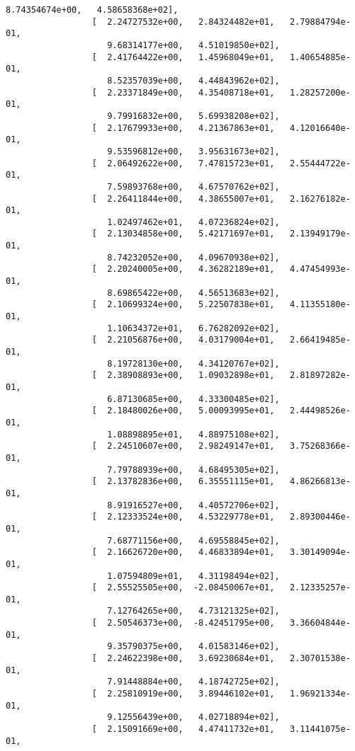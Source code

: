 \documentclass[11pt]{article}
\begin{document}
\begin{Verbatim}[commandchars=\\\{\}]
                    8.74354674e+00,   4.58658368e+02],
                 [  2.24727532e+00,   2.84324482e+01,   2.79884794e-01,
                    9.68314177e+00,   4.51019850e+02],
                 [  2.41764422e+00,   1.45968049e+01,   1.40654885e-01,
                    8.52357039e+00,   4.44843962e+02],
                 [  2.23371849e+00,   4.35408718e+01,   1.28257200e-01,
                    9.79916832e+00,   5.69938208e+02],
                 [  2.17679933e+00,   4.21367863e+01,   4.12016640e-01,
                    9.53596812e+00,   3.95631673e+02],
                 [  2.06492622e+00,   7.47815723e+01,   2.55444722e-01,
                    7.59893768e+00,   4.67570762e+02],
                 [  2.26411844e+00,   4.38655007e+01,   2.16276182e-01,
                    1.02497462e+01,   4.07236824e+02],
                 [  2.13034858e+00,   5.42171697e+01,   2.13949179e-01,
                    8.74232052e+00,   4.09670938e+02],
                 [  2.20240005e+00,   4.36282189e+01,   4.47454993e-01,
                    8.69865422e+00,   4.56513683e+02],
                 [  2.10699324e+00,   5.22507838e+01,   4.11355180e-01,
                    1.10634372e+01,   6.76282092e+02],
                 [  2.21056876e+00,   4.03179004e+01,   2.66419485e-01,
                    8.19728130e+00,   4.34120767e+02],
                 [  2.38908893e+00,   1.09032898e+01,   2.81897282e-01,
                    6.87130685e+00,   4.33300485e+02],
                 [  2.18480026e+00,   5.00093995e+01,   2.44498526e-01,
                    1.08898895e+01,   4.88975108e+02],
                 [  2.24510607e+00,   2.98249147e+01,   3.75268366e-01,
                    7.79788939e+00,   4.68495305e+02],
                 [  2.13782836e+00,   6.35551115e+01,   4.86266813e-01,
                    8.91916527e+00,   4.40572706e+02],
                 [  2.12333524e+00,   4.53229778e+01,   2.89300446e-01,
                    7.68771156e+00,   4.69558845e+02],
                 [  2.16626720e+00,   4.46833894e+01,   3.30149094e-01,
                    1.07594809e+01,   4.31198494e+02],
                 [  2.55525505e+00,  -2.08450067e+01,   2.12335257e-01,
                    7.12764265e+00,   4.73121325e+02],
                 [  2.50546373e+00,  -8.42451795e+00,   3.36604844e-01,
                    9.35790375e+00,   4.01583146e+02],
                 [  2.24622398e+00,   3.69230684e+01,   2.30701538e-01,
                    7.91448884e+00,   4.18742725e+02],
                 [  2.25810919e+00,   3.89446102e+01,   1.96921334e-01,
                    9.12556439e+00,   4.02718894e+02],
                 [  2.15091669e+00,   4.47411732e+01,   3.11441075e-01,

\end{Verbatim}
\end{document}
